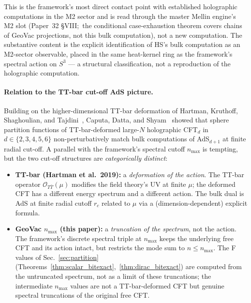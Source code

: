 \documentclass[11pt,a4paper]{article}
\theoremstyle{plain}
\theoremstyle{definition}
\newcommand{\nmax}{n_{\max}}
\newcommand{\sthree}{S^{3}}
\begin{document}
This is the framework's most direct contact point with established
holographic computations in the M2 sector and is read through the
master Mellin engine's M2 slot (Paper~32 \S VIII;\ the conditional
case-exhaustion theorem covers chains of GeoVac projections, not this
bulk computation), not a new computation. The substantive content is the explicit
identification of HS's bulk computation as an M2-sector observable,
placed in the same heat-kernel ring as the framework's spectral action
on $\sthree$ --- a structural classification, not a reproduction of the
holographic computation.

\paragraph{Relation to the TT-bar cut-off AdS picture.}
Building on the higher-dimensional TT-bar deformation of Hartman,
Kruthoff, Shaghoulian, and Tajdini~\cite{hartman_kruthoff_shaghoulian_tajdini2019},
Caputa, Datta, and Shyam~\cite{caputa_datta_shyam2019}
showed that sphere partition functions of TT-bar-deformed large-$N$
holographic CFT$_d$ in $d \in \{2, 3, 4, 5, 6\}$ non-perturbatively
match bulk computations of AdS$_{d+1}$ at finite radial cut-off. A
parallel with the framework's spectral cutoff $\nmax$ is tempting, but
the two cut-off structures are \emph{categorically distinct}:

\begin{itemize}
\item \textbf{TT-bar (Hartman et al.~2019):} a \emph{deformation of the
action}. The TT-bar operator $\mathcal{O}_{T\bar T}(\mu)$ modifies the
field theory's UV at finite $\mu$; the deformed CFT has a different
energy spectrum and a different action. The bulk dual is AdS at finite
radial cutoff $r_c$ related to $\mu$ via a (dimension-dependent)
explicit formula.

\item \textbf{GeoVac $\nmax$ (this paper):} a \emph{truncation of the
spectrum}, not the action. The framework's discrete spectral triple at
$\nmax$ keeps the underlying free CFT and its action intact, but
restricts the mode sum to $n \le \nmax$. The F values of
Sec.~\ref{sec:partition}
(Theorems~\ref{thm:scalar_bitexact},~\ref{thm:dirac_bitexact}) are
computed from the untruncated spectrum, not as a limit of these
truncations; the intermediate $\nmax$ values are not a TT-bar-deformed
CFT but genuine spectral truncations of the original free CFT.
\end{itemize}
\end{document}
